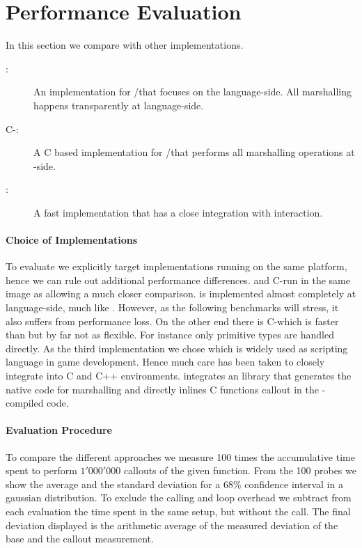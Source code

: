 \section{Performance Evaluation}

In this section we compare \NB with other \FFI implementations.
\begin{description}
	\item[\Alien \FFI:] An \FFI implementation for \Squeak/\PH that focuses on the lan\-guage-side. All marshalling happens transparently at language-side.
	\item[C-\FFI:] A C based \FFI implementation for \Squeak/\PH that performs all marshalling operations at \VM-side.
	\item[\LuaJIT:] A fast \Lua implementation that has a close \FFI integration with \JIT interaction.
\end{description}

\paragraph{Choice of \FFI Implementations}
To evaluate \NB we explicitly target \FFI implementations running on the same platform, hence we can rule out additional performance differences.
\Alien and C-\FFI run in the same \PH image as \NB allowing a much closer comparison.
\Alien \FFI is implemented almost completely at language-side, much like \NB.
However, as the following benchmarks will stress, it also suffers from performance loss.
On the other end there is C-\FFI which is faster than \Alien but by far not as flexible.
For instance only primitive types are handled directly.
As the third implementation we chose \Lua which is widely used as scripting language in game development.
Hence much care has been taken to closely integrate \Lua into C and C++ environments.
\LuaJIT integrates an \FFI library that generates the native code for marshalling and directly inlines C functions callout in the \JIT-compiled code.

\paragraph{Evaluation Procedure}
To compare the different \FFI approaches we measure 100 times the accumulative time spent to perform $1'000'000$ callouts of the given function.
From the 100 probes we show the average and the standard deviation for a $68\%$ confidence interval in a gaussian distribution.
To exclude the calling and loop overhead we subtract from each evaluation the time spent in the same setup, but without the \FFI call.
The final deviation displayed is the arithmetic average of the measured deviation of the base and the callout measurement.

